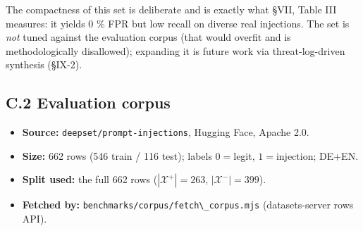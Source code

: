 {\def\LTcaptype{none} %
\begin{table}[!t]\centering\scriptsize
{}
\end{table}
}

The compactness of this set is deliberate and is exactly what §VII,
Table III measures: it yields 0 \% FPR but low recall on diverse real
injections. The set is \emph{not} tuned against the evaluation corpus
(that would overfit and is methodologically disallowed); expanding it is
future work via threat-log-driven synthesis (§IX-2).

\subsection{C.2 Evaluation corpus}\label{c2-evaluation-corpus}

\begin{itemize}
\tightlist
\item
  \textbf{Source:} \passthrough{\lstinline!deepset/prompt-injections!},
  Hugging Face, Apache 2.0.
\item
  \textbf{Size:} 662 rows (546 train / 116 test); labels \(0=\)legit,
  \(1=\)injection; DE+EN.
\item
  \textbf{Split used:} the full 662 rows (\(|\mathcal{X}^+|=263\),
  \(|\mathcal{X}^-|=399\)).
\item
  \textbf{Fetched by:}
  \passthrough{\lstinline!benchmarks/corpus/fetch\_corpus.mjs!}
  (datasets-server rows API).
\end{itemize}

